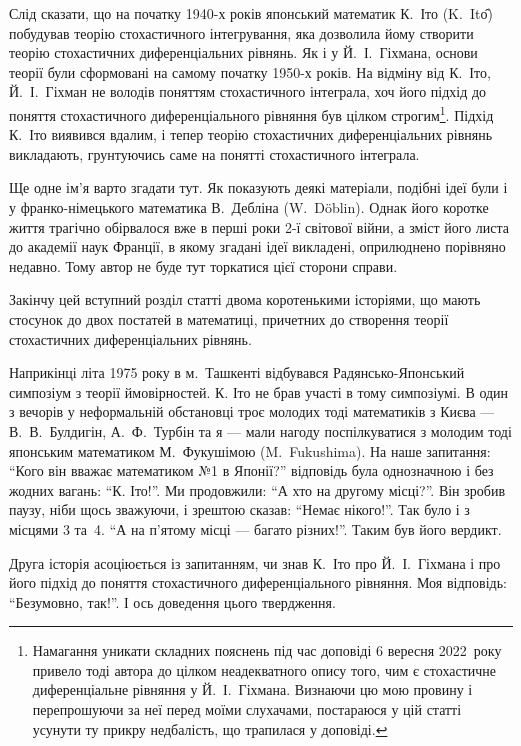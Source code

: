 \documentclass[11pt, reqno]{amsart}
\begin{document}
Слід сказати, що на початку 1940-х років японський математик К.~Іто (K.~It\^{о}) побудував теорію стохастичного інтегрування, яка дозволила йому створити теорію стохастичних диференціальних рівнянь. Як і у  Й.~І.~Гіхмана, основи теорії були сформовані на самому початку 1950-х років. На відміну від К.~Іто, Й.~І.~Гіхман не володів поняттям стохастичного інтеграла, хоч його підхід до поняття стохастичного диференціального рівняння був цілком строгим\footnote{Намагання уникати складних пояснень під час доповіді 6 вересня 2022~року привело тоді автора до цілком неадекватного опису того, чим є стохастичне диференціальне рівняння у  Й.~І.~Гіхмана. Визнаючи цю мою провину і перепрошуючи за неї перед моїми слухачами, постараюся у цій статті усунути ту прикру недбалість, що трапилася у доповіді.}. Підхід К.~Іто виявився вдалим, і тепер теорію стохастичних диференціальних рівнянь викладають, грунтуючись саме на понятті стохастичного інтеграла.

Ще одне ім'я варто згадати тут. Як показують деякі матеріали, подібні ідеї були і у франко-німецького математика В.~Дебліна (W.~D\"{o}blin). Однак його коротке життя трагічно обірвалося вже в перші роки 2-ї світової війни, а зміст його листа до академії наук Франції, в якому згадані ідеї викладені, оприлюднено порівняно недавно. Тому автор не буде тут торкатися цієї сторони справи.

Закінчу цей вступний розділ статті двома коротенькими історіями, що мають стосунок до двох
постатей в математиці, причетних до створення теорії стохастичних диференціальних рівнянь.

Наприкінці літа 1975 року в м.~Ташкенті відбувався Радянсько-Япон\-ський симпозіум з теорії
ймовірностей. К. Іто не брав участі в тому симпозіумі. В один з вечорів у неформальній обстановці
троє молодих тоді математиків з Києва --- В.~В.~Булдигін, А.~Ф.~Турбін та я --- мали нагоду поспілкуватися з молодим тоді японським математиком М.~Фукушімою (M.~Fukushima). На наше запитання: ``Кого він вважає математиком №1 в Японії?'' відповідь була однозначною і без жодних вагань: ``К. Іто!''. Ми продовжили: ``А хто на другому місці?''. Він зробив паузу, ніби щось зважуючи, і зрештою сказав: ``Немає нікого!''. Так було і з місцями 3 та~4. ``А на п’ятому місці --- багато різних!''. Таким був його вердикт.

Друга історія асоціюється із запитанням, чи знав К.~Іто про Й.~І.~Гіхмана і про його підхід до поняття стохастичного диференціального рівняння. Моя відповідь: ``Безумовно, так!''. І ось доведення цього твердження.
\end{document}
